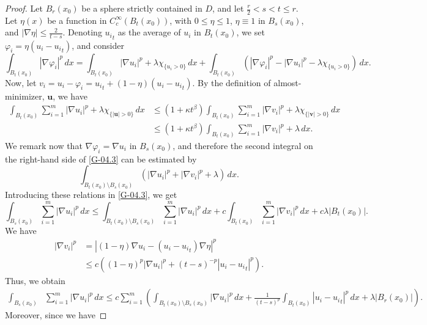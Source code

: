 \documentclass{amsart}
\begin{document}
\begin{proof}
Let $B_r(x_0)$ be a sphere strictly contained in $D$, and let $\frac{r}{2} < s< t \leq r$. Let $\eta(x)$ be a function in $C_c^{\infty}(B_t(x_0))$, with $0 \leq \eta \leq 1$, $\eta \equiv 1$ in $B_s(x_0)$, and $|\nabla \eta| \leq \frac{2}{t-s}$. Denoting ${u_i}_t$ as the average of $u_i$ in $B_{t}(x_0)$, we set $\varphi_i=\eta(u_i-{u_i}_t)$, and consider
\begin{equation}
\label{G-04.3}
\int_{B_t(x_0)} | \nabla \varphi_i|^p \, dx = \int_{B_t(x_0)} | \nabla u_i|^p + \lambda \chi_{\{u_i>0\}} \, dx + \int_{B_t(x_0)}  \left( | \nabla \varphi_i|^p - | \nabla u_i|^p - \lambda \chi_{\{u_i>0\}}\right) \, dx.
\end{equation}
Now, let $v_i=u_i-\varphi_i={u_i}_t+(1-\eta)(u_i-{u_i}_t)$. 
By the definition of almost-minimizer, $\mathbf{u}$, we have 
$$
\begin{aligned}
\int_{B_t(x_0)} \sum_{i=1}^m|\nabla u_i|^p + \lambda \chi_{\{|\mathbf{u}|>0\}} \, dx & \leq \left(1+\kappa t^{\beta} \right) \int_{B_t(x_0)} \sum_{i=1}^m|\nabla v_i|^p + \lambda \chi_{\{|\mathbf{v}|>0\}} \, dx \\
& \leq \left(1+\kappa t^{\beta} \right) \int_{B_t(x_0)} \sum_{i=1}^m|\nabla v_i|^p + \lambda \, dx.
\end{aligned}
$$
We remark now that $\nabla \varphi_i = \nabla u_i$ in $B_s(x_0)$, and therefore the second integral on the right-hand side of \eqref{G-04.3} can be estimated by
$$ \int_{B_t(x_0) \setminus B_s(x_0)} \left(  | \nabla u_i|^p + | \nabla v_i|^p + \lambda \right) \, dx. $$
Introducing these relations in \eqref{G-04.3}, we get 
$$ \int_{B_s(x_0)} \sum_{i=1}^m|\nabla u_i|^p \, dx 
\leq \int_{B_t(x_0) \setminus B_s(x_0)}\sum_{i=1}^m |\nabla u_i|^p \, dx + c \int_{B_t(x_0)} \sum_{i=1}^m|\nabla v_i|^p \, dx + c \lambda \left| B_t(x_0) \right|. $$
We have
$$
\begin{aligned}
|\nabla v_i|^p &= \left|(1-\eta) \nabla u_i - (u_i-{u_i}_t) \nabla \eta \right|^p \\
& \leq c \left( (1-\eta)^p |\nabla u_i|^p + (t-s)^{-p} |u_i-{u_i}_t|^p \right).
\end{aligned}
$$
Thus, we obtain
$$
\begin{aligned}
\int_{B_s(x_0)} & \sum_{i=1}^m|\nabla u_i|^p \, dx 
\leq c\sum_{i=1}^m \left( \int_{B_t(x_0) \setminus B_s(x_0)} |\nabla u_i|^p \, dx + \frac{1}{(t-s)^p} \int_{B_t(x_0)} |u_i-{u_i}_t|^p \, dx + \lambda \left| B_r(x_0) \right| \right).
\end{aligned}
$$
Moreover, since we have 

\end{proof}
\end{document}
